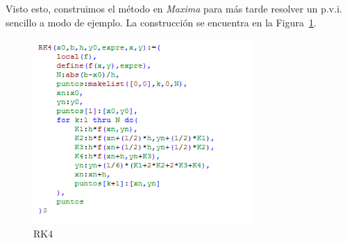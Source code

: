 \documentclass[paper=a4, fontsize=11pt]{scrartcl} %
\numberwithin{equation}{section}
\begin{document}
	Visto esto, construimos el método en \textit{Maxima} para más tarde resolver un p.v.i. sencillo a modo de ejemplo. La construcción se encuentra en la Figura~\ref{fig:RK4}.
	\begin{figure}[H]
		\includegraphics[width=0.75\textwidth]{rk.png}
		\caption{RK4}
		\label{fig:RK4}
	\end{figure}
\end{document}
